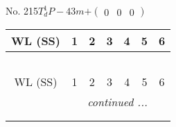 \documentclass[fleqn,9pt,landscape]{jsarticle}
\begin{document}
\newpage
No. 215\quad$T_{d}^{1}$\quad$P-43m$\quad[ cubic ]\quad$+\begin{pmatrix} 0 & 0 & 0 \end{pmatrix}$
\begin{center}
\renewcommand{\arraystretch}{1.2}
\begin{longtable}{ccccccc}
 \hline \hline
WL (SS) & 1 & 2 & 3 & 4 & 5 & 6 \\ \hline \endfirsthead

\multicolumn{6}{l}{\tablename\ \thetable{}} \\
 \hline \hline
WL (SS) & 1 & 2 & 3 & 4 & 5 & 6 \\ \hline \endhead

 \hline \hline
\multicolumn{6}{r}{\footnotesize\it continued ...} \\ \endfoot

 \hline \hline
\multicolumn{6}{r}{} \\ \endlastfoot


\end{longtable}
\end{center}
\end{document}
